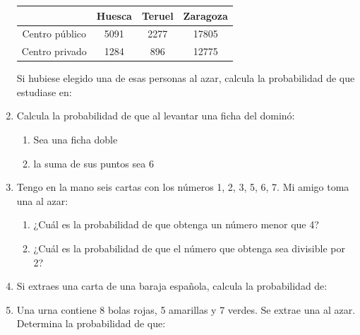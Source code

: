 \documentclass[twoside]{article}
\begin{document}
\begin{enumerate}
\begin{tabular}{|c|c|c|c|}
\hline 
 & Huesca & Teruel & Zaragoza \\ 
\hline 
Centro público & 5091 & 2277 & 17805 \\ 
\hline 
Centro privado & 1284 & 896 & 12775 \\ 
\hline 
\end{tabular} 

Si hubiese elegido una de esas personas al azar, calcula la probabilidad de que estudiase en:
\begin{enumerate}
\end{enumerate}
\item Calcula la probabilidad de que al levantar una ficha del dominó:
\begin{enumerate}
\item Sea una ficha doble
\item la suma de sus puntos sea 6
\end{enumerate}
\item Tengo en la mano seis cartas con los números 1, 2, 3, 5, 6, 7. Mi amigo toma una al azar:
\begin{enumerate}
\item ¿Cuál es la probabilidad de que obtenga un número menor que 4?
\item ¿Cuál es la probabilidad de que el número que obtenga sea divisible por 2?
\end{enumerate}
\item Si extraes una carta de una baraja española, calcula la probabilidad de:
\begin{enumerate}
\end{enumerate}
\item Una urna contiene 8 bolas rojas, 5 amarillas y 7 verdes. Se extrae una al azar. Determina la probabilidad de que:
\begin{enumerate}

\end{enumerate}
\end{enumerate}
\end{document}
